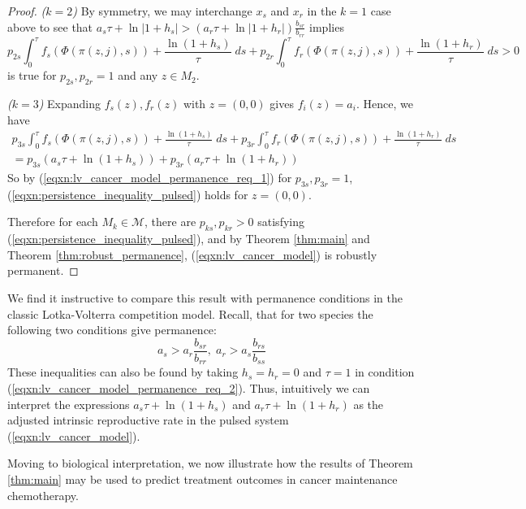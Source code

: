 \documentclass{article}
\theoremstyle{definition}
\begin{document}
\begin{proof}
    \textit{($k = 2$)}  
    By symmetry, we may interchange $x_s$ and $x_r$ in the $k = 1$ case above to see that $a_s\tau + \ln{|1+h_s|} > \left(a_r\tau + \ln{|1 + h_r|}\right)\frac{b_{sr}}{b_{rr}}$ implies
    \begin{equation*}
        p_{2s}\int_0^{\tau} f_s(\Phi(\pi(z,j),s)) + \frac{\ln{(1+h_s)}}{\tau}\; ds +  p_{2r} \int_0^{\tau} f_r(\Phi(\pi(z,j),s)) + \frac{\ln{(1+h_r)}}{\tau}\; ds > 0
    \end{equation*}
    is true for $p_{2s}, p_{2r} = 1$ and any $z \in M_2$.

    \textit{($k = 3$)}
    Expanding $f_s(z), f_r(z)$ with $z = (0,0)$ gives $f_i(z) = a_i$. Hence, we have
    \begin{equation*}
    \begin{split}
        p_{3s} \int_0^{\tau} f_s(\Phi(\pi(z,j), s)) + \frac{\ln{(1+h_s)}}{\tau}\; ds +  p_{3r} \int_0^{\tau} f_r(\Phi(\pi(z,j), s)) + \frac{\ln{(1+h_r)}}{\tau}\; ds \\
        =
        p_{3s} (a_s \tau + \ln{(1+h_s)}) + p_{3r}( a_r \tau + \ln{(1+h_r)})
    \end{split}
    \end{equation*}
    So by (\ref{eqxn:lv_cancer_model_permanence_req_1}) for $p_{3s}, p_{3r} = 1$, (\ref{eqxn:persistence_inequality_pulsed}) holds for $z = (0,0)$. 
    
    Therefore for each $M_k \in \mathcal{M}$, there are $p_{ks}, p_{kr} > 0$ satisfying (\ref{eqxn:persistence_inequality_pulsed}), and by Theorem \ref{thm:main} and Theorem \ref{thm:robust_permanence}, (\ref{eqxn:lv_cancer_model}) is robustly permanent.
\end{proof}


We find it instructive to compare this result with permanence conditions in the classic Lotka-Volterra competition model. Recall, that for two species the following two conditions give permanence:
$$
a_s > a_r\frac{b_{sr}}{b_{rr}}, \; a_r > a_s\frac{b_{rs}}{b_{ss}}
$$
These inequalities can also be found by taking $h_s = h_r = 0$ and $\tau = 1$ in condition (\ref{eqxn:lv_cancer_model_permanence_req_2}). Thus, intuitively we can interpret the expressions $a_s\tau +\ln{(1+h_s)}$ and $a_r\tau + \ln{(1+h_r)}$ as the adjusted intrinsic reproductive rate in the pulsed system (\ref{eqxn:lv_cancer_model}).

Moving to biological interpretation, we now illustrate how the results of Theorem \ref{thm:main} may be used to predict treatment outcomes in cancer maintenance chemotherapy.
\end{document}

